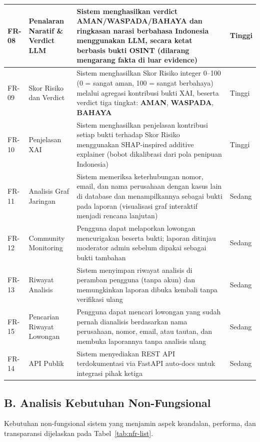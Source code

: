 \documentclass[12pt,a4paper]{article}
\begin{document}
\begin{xltabular}{\linewidth}{|L{1.3cm}|L{2.8cm}|Y|C{1.5cm}|}
FR-08 & Penalaran Naratif \& Verdict LLM & Sistem menghasilkan verdict \textbf{AMAN}/\textbf{WASPADA}/\textbf{BAHAYA} dan ringkasan narasi berbahasa Indonesia menggunakan LLM, secara ketat berbasis bukti OSINT (dilarang mengarang fakta di luar evidence) & Tinggi \\ \hline
{}
FR-09 & Skor Risiko dan Verdict & Sistem menghasilkan Skor Risiko integer 0--100 (0 = sangat aman, 100 = sangat berbahaya) melalui agregasi kontribusi bukti XAI, beserta verdict tiga tingkat: \textbf{AMAN}, \textbf{WASPADA}, \textbf{BAHAYA} & Tinggi \\ \hline
FR-10 & Penjelasan XAI & Sistem menghasilkan penjelasan kontribusi setiap bukti terhadap Skor Risiko menggunakan SHAP-inspired additive explainer (bobot dikalibrasi dari pola penipuan Indonesia) & Tinggi \\ \hline
{}
FR-11 & Analisis Graf Jaringan & Sistem memeriksa keterhubungan nomor, email, dan nama perusahaan dengan kasus lain di database dan menampilkannya sebagai bukti pada laporan (visualisasi graf interaktif menjadi rencana lanjutan) & Sedang \\ \hline
{}FR-12 & Community Monitoring & Pengguna dapat melaporkan lowongan mencurigakan beserta bukti; laporan ditinjau moderator admin sebelum dipakai sebagai bukti tambahan & Sedang \\ \hline
{}
FR-13 & Riwayat Analisis & Sistem menyimpan riwayat analisis di peramban pengguna (tanpa akun) dan memungkinkan laporan dibuka kembali tanpa verifikasi ulang & Sedang \\ \hline
{}FR-15 & Pencarian Riwayat Lowongan & Pengguna dapat mencari lowongan yang sudah pernah dianalisis berdasarkan nama perusahaan, nomor, email, atau tautan, dan membuka laporannya tanpa analisis ulang & Sedang \\ \hline
FR-14 & API Publik & Sistem menyediakan REST API terdokumentasi via FastAPI auto-docs untuk integrasi pihak ketiga & Sedang \\ \hline
\end{xltabular}
\endgroup

\subsection*{B. Analisis Kebutuhan Non-Fungsional}
Kebutuhan non-fungsional sistem yang menjamin aspek keandalan, performa, dan transparansi dijelaskan pada Tabel~\ref{tab:nfr-list}.
\end{document}

